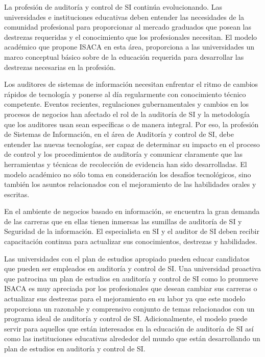 \begin{syllabus}


\begin{justification}
	La profesión de auditoría y control de SI continúa evolucionando. Las universidades e
	instituciones educativas deben entender las necesidades de la comunidad profesional
	para proporcionar al mercado graduados que posean las destrezas requeridas y el
	conocimiento que los profesionales necesitan. El modelo académico que propone
	ISACA en esta área, proporciona a las universidades un marco conceptual básico
	sobre de la educación requerida para desarrollar las destrezas necesarias en la
	profesión.
	
	Los auditores de sistemas de información necesitan enfrentar el ritmo de cambios
	rápidos de tecnología y ponerse al día regularmente con conocimiento técnico
	competente. Eventos recientes, regulaciones gubernamentales y cambios en los
	procesos de negocios han afectado el rol de la auditoría de SI y la metodología que los
	auditores usan sean específicas o de manera integral. Por eso, la profesión de
	Sistemas de Información, en el área de Auditoría y control de SI, debe entender las
	nuevas tecnologías, ser capaz de determinar su impacto en el proceso de control y los
	procedimientos de auditoría y comunicar claramente que las herramientas y técnicas
	de recolección de evidencia han sido desarrolladas. El modelo académico no sólo
	toma en consideración los desafíos tecnológicos, sino también los asuntos
	relacionados con el mejoramiento de las habilidades orales y escritas.
	
	En el ambiente de negocios basado en información, se encuentra la gran demanda de
	las carreras que en ellas tienen inmersas las sumillas de auditoría de SI y Seguridad
	de la información. El especialista en SI y el auditor de SI deben recibir capacitación
	continua para actualizar sus conocimientos, destrezas y habilidades.
	
	Las universidades con el plan de estudios apropiado pueden educar candidatos que
	pueden ser empleados en auditoría y control de SI. Una universidad proactiva que
	patrocina un plan de estudios en auditoría y control de SI como lo promueve ISACA es
	muy apreciada por los profesionales que desean cambiar sus carreras o actualizar sus
	destrezas para el mejoramiento en su labor ya que este modelo proporciona un
	razonable y comprensivo conjunto de temas relacionados con un programa ideal de
	auditoría y control de SI. Adicionalmente, el modelo puede servir para aquellos que
	están interesados en la educación de auditoría de SI así como las instituciones
	educativas alrededor del mundo que están desarrollando un plan de estudios en
	auditoría y control de SI.
	\end{justification}
	

\end{syllabus}

